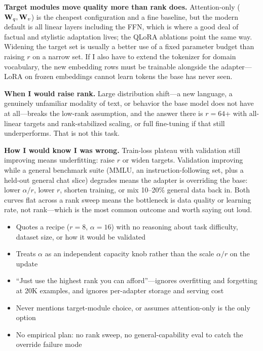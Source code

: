 \begin{interviewq}
\textbf{Target modules move quality more than rank does.} Attention-only ($\mathbf{W}_q, \mathbf{W}_v$) is the cheapest configuration and a fine baseline, but the modern default is all linear layers including the FFN, which is where a good deal of factual and stylistic adaptation lives; the QLoRA ablations point the same way. Widening the target set is usually a better use of a fixed parameter budget than raising $r$ on a narrow set. If I also have to extend the tokenizer for domain vocabulary, the new embedding rows must be trainable alongside the adapter---LoRA on frozen embeddings cannot learn tokens the base has never seen.

\textbf{When I would raise rank.} Large distribution shift---a new language, a genuinely unfamiliar modality of text, or behavior the base model does not have at all---breaks the low-rank assumption, and the answer there is $r = 64$+ with all-linear targets and rank-stabilized scaling, or full fine-tuning if that still underperforms. That is not this task.

\textbf{How I would know I was wrong.} Train-loss plateau with validation still improving means underfitting: raise $r$ or widen targets. Validation improving while a general benchmark suite (MMLU, an instruction-following set, plus a held-out general chat slice) degrades means the adapter is overriding the base: lower $\alpha/r$, lower $r$, shorten training, or mix 10--20\% general data back in. Both curves flat across a rank sweep means the bottleneck is data quality or learning rate, not rank---which is the most common outcome and worth saying out loud.

\redflags
\begin{itemize}
    \item Quotes a recipe ($r = 8$, $\alpha = 16$) with no reasoning about task difficulty, dataset size, or how it would be validated
    \item Treats $\alpha$ as an independent capacity knob rather than the scale $\alpha/r$ on the update
    \item ``Just use the highest rank you can afford''---ignores overfitting and forgetting at 20K examples, and ignores per-adapter storage and serving cost
    \item Never mentions target-module choice, or assumes attention-only is the only option
    \item No empirical plan: no rank sweep, no general-capability eval to catch the override failure mode
\end{itemize}


\end{interviewq}
